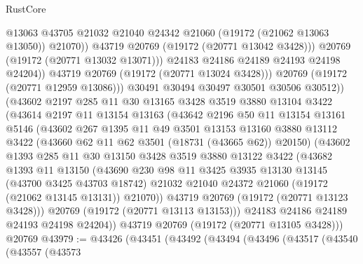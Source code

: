 \begin{lexlean}{RustCore}
\begin{coremodule}
                        @13063
                        @43705
                        @21032
                        @21040
                        @24342
                        @21060
                        (@19172 (@21062 @13063 @13050))
                        @21070))
                    @43719
                    @20769
                    (@19172 (@20771 @13042 @3428)))
                  @20769
                  (@19172 (@20771 @13032 @13071)))
                @24183
                @24186
                @24189
                @24193
                @24198
                @24204))
            @43719
            @20769
            (@19172 (@20771 @13024 @3428)))
          @20769
          (@19172 (@20771 @12959 @13086)))
        @30491
        @30494
        @30497
        @30501
        @30506
        @30512))
    (@43602
      @2197
      @285
      @11
      @30
      @13165
      @3428
      @3519
      @3880
      @13104
      @3422
      (@43614
        @2197
        @11
        @13154
        @13163
        (@43642
          @2196
          @50
          @11
          @13154
          @13161
          @5146
          (@43602
            @267
            @1395
            @11
            @49
            @3501
            @13153
            @13160
            @3880
            @13112
            @3422
            (@43660 @62 @11 @62 @3501 (@18731 (@43665 @62)) @20150)
            (@43602
              @1393
              @285
              @11
              @30
              @13150
              @3428
              @3519
              @3880
              @13122
              @3422
              (@43682
                @1393
                @11
                @13150
                (@43690
                  @230
                  @98
                  @11
                  @3425
                  @3935
                  @13130
                  @13145
                  (@43700 @3425 @43703 @18742)
                  @21032
                  @21040
                  @24372
                  @21060
                  (@19172 (@21062 @13145 @13131))
                  @21070))
              @43719
              @20769
              (@19172 (@20771 @13123 @3428)))
            @20769
            (@19172 (@20771 @13113 @13153)))
          @24183
          @24186
          @24189
          @24193
          @24198
          @24204))
      @43719
      @20769
      (@19172 (@20771 @13105 @3428)))
    @20769
@43979 := @43426
    (@43451
      (@43492
        (@43494
          (@43496
            (@43517
              (@43540
                (@43557
                  (@43573

\end{coremodule}
\end{lexlean}
